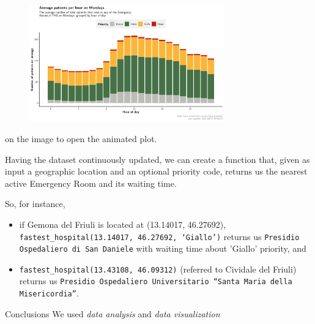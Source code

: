 \documentclass[8pt,english,aspectratio=169]{beamer}
\begin{document}
\begin{frame}

\begin{figure}
  \centering
  \href{http://uniud.enricostefanel.it/datascience/project/images/10_day-priority_bars.gif}{\includegraphics[width=0.75\textwidth]{../images/10_day-priority_bars.jpg}}
\end{figure}
\scriptsize \href{http://uniud.enricostefanel.it/datascience/project/images/10_day-priority_bars.gif}{\color{gray}{Click}} on the image to open the animated plot.

\end{frame}

\begin{frame}
Having the dataset continuously updated, we can create a function that, given as input a geographic location and an optional priority code, returns us the nearest active Emergency Room and its waiting time.

So, for instance,
\begin{itemize}
	\item if Gemona del Friuli is located at (13.14017, 46.27692), \texttt{fastest\_hospital(13.14017, 46.27692, `Giallo')} returns us \texttt{Presidio Ospedaliero di San Daniele} with waiting time about 'Giallo' priority, and
	\item \texttt{fastest\_hospital(13.43108, 46.09312)} (referred to Cividale del Friuli) returns us \texttt{Presidio Ospedaliero Universitario ``Santa Maria della Misericordia''}.
\end{itemize}
\end{frame}


\begin{frame}{Conclusions}
We used \textit{data analysis} and \textit{data visualization}


\end{frame}
\end{document}
